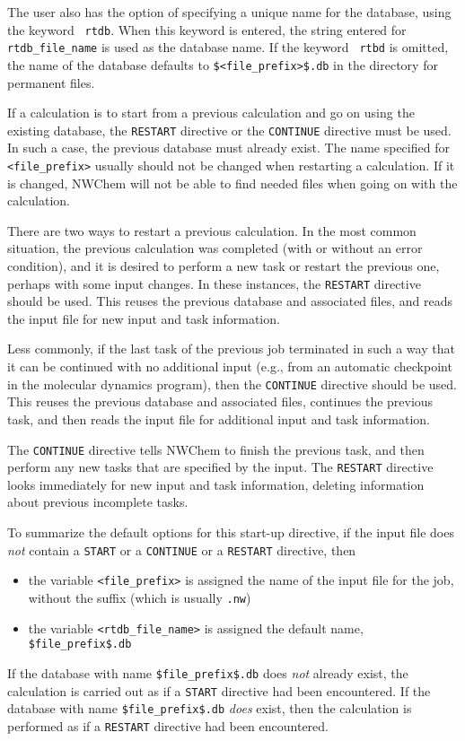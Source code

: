 The user also has the option of
specifying a unique name for the database, using the keyword {\tt
  rtdb}.  When this keyword is entered, the string entered for {\tt
  rtdb\_file\_name} is used as the database name.  If the keyword {\tt
  rtbd} is omitted, the name of the database defaults to
\verb+$<file_prefix>$.db+ in the directory for permanent files.

If a calculation is to start from a previous calculation and go on
using the existing database, the \verb+RESTART+ directive or the
\verb+CONTINUE+ directive must be used.  In such a case, the previous
database must already exist.  The name specified for {\tt <file\_prefix>} 
usually should
not be changed when restarting a calculation.  If it is changed, NWChem 
will not
be able to find needed files when going on with the
calculation.

There are two ways to restart a previous calculation.  In the most common
situation, the previous calculation was completed (with or without an error
condition), and it is desired to perform a new task or restart the
previous one, perhaps with some input changes.  In these instances,
the \verb+RESTART+ directive should be used.  This reuses the previous
database and associated files, and reads the input file for new input
and task information.

Less commonly, if the last task of the previous job terminated in such
a way that  it can be continued with no additional
input (e.g., from an automatic
checkpoint in the molecular dynamics program), then the 
\verb+CONTINUE+ directive should be used.  This reuses
the previous database and associated files, continues the previous
task, and then reads the input file for additional input and task
information.

The \verb+CONTINUE+ directive tells NWChem to finish the previous
task, and then perform any new tasks that are specified by the input.
The \verb+RESTART+ directive looks immediately for new input and task
information, deleting information about previous incomplete tasks.

To summarize the default options for this start-up directive, if the 
input file does {\em not} contain a \verb+START+ or a \verb+CONTINUE+ or a
\verb+RESTART+ directive, then
\begin{itemize}
  \item the variable {\tt <file\_prefix>} is assigned the name of the 
input file for the job, without the suffix (which is usually \verb+.nw+)
  \item the variable {\tt <rtdb\_file\_name>} is assigned the default name,
\verb+$file_prefix$.db+
\end{itemize}
If the database with name \verb+$file_prefix$.db+ does {\em not} 
already exist,
the calculation is carried out as if a \verb+START+ directive had
been encountered.  If the database with name \verb+$file_prefix$.db+
{\em does} exist, then the calculation is performed as if a
\verb+RESTART+ directive had been encountered.  

